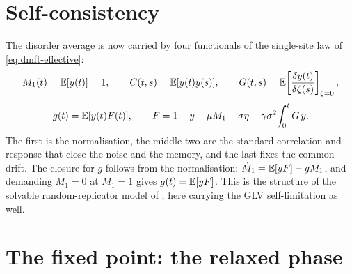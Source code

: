 \section{Self-consistency}
\label{sec:dmft-selfconsistency}

The disorder average is now carried by four functionals of the single-site law of
\eqref{eq:dmft-effective}:
\begin{equation}
    M_1(t) = \mathbb{E}[y(t)] = 1,\qquad
    C(t,s) = \mathbb{E}[y(t)y(s)],\qquad
    G(t,s) = \mathbb{E}\!\left[\frac{\delta y(t)}{\delta\zeta(s)}\right]_{\zeta=0},
\end{equation}
\begin{equation}
    g(t) = \mathbb{E}[y(t)F(t)],\qquad
    F = 1 - y - \mu M_1 + \sigma\eta + \gamma\sigma^2\!\int_0^t G\,y .
    \label{eq:dmft-closures}
\end{equation}
The first is the normalisation, the middle two are the standard correlation and response
that close the noise and the memory, and the last fixes the common drift. The closure for
$g$ follows from the normalisation: $\dot M_1 = \mathbb{E}[yF] - g M_1$, and demanding $\dot M_1 = 0$
at $M_1 = 1$ gives $g(t) = \mathbb{E}[yF]$. This is the structure of the solvable random-replicator
model of \citet{diederich1989}, here carrying the GLV self-limitation as well.

\section{The fixed point: the relaxed phase}
\label{sec:dmft-fixedpoint}

